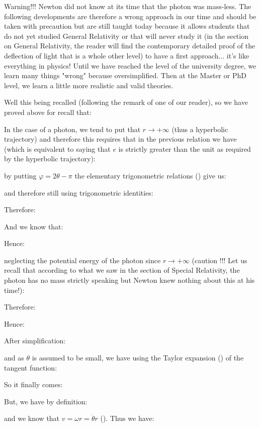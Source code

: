 	Warning!!! Newton did not know at its time that the photon was mass-less. The following developments are therefore a wrong approach in our time and should be taken with precaution but are still taught today because it allows students that do not yet studied General Relativity or that will never study it  (in the section on General Relativity, the reader will find the contemporary detailed proof of the deflection of light that is a whole other level) to have a first approach... it's like everything in physics! Until we have reached the level of the university degree, we learn many things "wrong" because oversimplified. Then at the Master or PhD level, we learn a little more realistic and valid theories.

	Well this being recalled (following the remark of one of our reader), so we have proved above for recall that:
	
	In the case of a photon, we tend to put that $r\rightarrow +\infty$ (thus a hyperbolic trajectory) and therefore this requires that in the previous relation we have (which is equivalent to saying that $e$ is strictly greater than the unit as required by the hyperbolic trajectory):
	
	by putting $\varphi=2\theta-\pi$ the elementary trigonometric relations () give us:
	
	and therefore still using trigonometric identities:
	
	Therefore:
	
	And we know that:
	
	Hence:
	
	neglecting the potential energy of the photon since $r\rightarrow +\infty$ (caution !!! Let us recall that according to what we saw in the section of Special Relativity, the photon has no mass strictly speaking but Newton knew nothing about this at his time!):
	
	Therefore:
	
	Hence:
	
	After simplification:
	
	and as $\theta$ is assumed to be small, we have using the Taylor expansion () of the tangent function:
	
	So it finally comes:
	
	But, we have by definition:
	
	and we know that $v=\omega r=\dot{\theta}r$ (). Thus we have:
	
